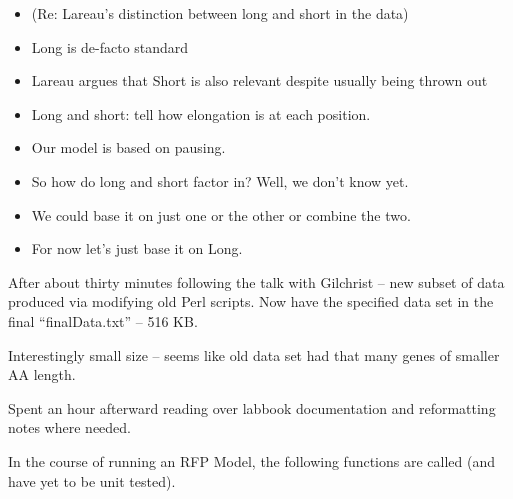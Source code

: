 \documentclass[12pt,hyperref]{labbook}
\begin{document}
\noindent\makebox[\linewidth]{\rule{\paperwidth}{0.4pt}}

\begin{itemize}
    \item (Re: Lareau's distinction between long and short in the data)
    \item Long is de-facto standard
    \item Lareau argues that Short is also relevant despite usually being thrown out
    \item Long and short: tell how elongation is at each position.
    \item Our model is based on pausing. 
    \item So how do long and short factor in? Well, we don't know yet.
    \item We could base it on just one or the other or combine the two.
    \item For now let's just base it on Long.
\end{itemize}

\noindent\makebox[\linewidth]{\rule{\paperwidth}{0.4pt}}

After about thirty minutes following the talk with Gilchrist -- new 
subset of data produced via modifying old Perl scripts. Now have the specified data set
in the final \enquote{finalData.txt} -- 516 KB.

Interestingly small size -- seems like old data set had that many genes of smaller AA length.

\noindent\makebox[\linewidth]{\rule{\paperwidth}{0.4pt}}

Spent an hour afterward reading over labbook documentation and reformatting notes where needed.

In the course of running an RFP Model, the following functions are called (and have yet to be
unit tested).

\end{document}
